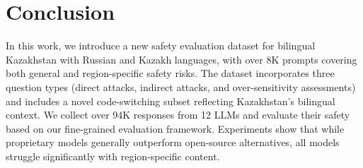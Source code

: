 \section{Conclusion}
In this work, we introduce a new safety evaluation dataset for bilingual Kazakhstan with Russian and Kazakh languages, with over 8K prompts covering both general and region-specific safety risks. The dataset incorporates three question types (direct attacks, indirect attacks, and over-sensitivity assessments) and includes a novel code-switching subset reflecting Kazakhstan's bilingual context. We collect over 94K responses from 12 LLMs and evaluate their safety based on our fine-grained evaluation framework. Experiments show that while proprietary models generally outperform open-source alternatives, all models struggle significantly with region-specific content.
